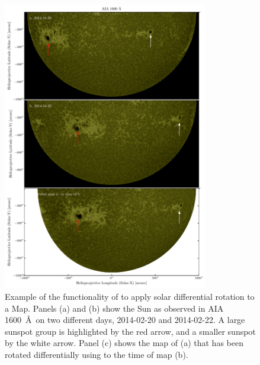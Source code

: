 \begin{figure}
    \center
    \includegraphics[width = 0.8\textwidth]{figures/fig_diff_rot_1600.pdf}
    \caption{Example of the functionality of \sunpy to apply solar differential rotation to a Map.
    Panels (a) and (b) show the Sun as observed in AIA 1600~\AA\ on two different days, 2014-02-20 and 2014-02-22.
    A large sunspot group is highlighted by the red arrow, and a smaller sunspot by the white arrow.
    Panel (c) shows the map of (a) that has been rotated differentially using \sunpy to the time of map (b).}
    \label{fig:diff_rot}
\end{figure}

